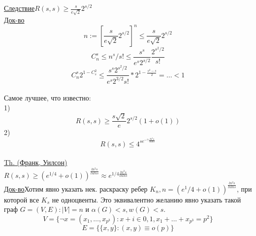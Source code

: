 \documentclass{article}
\begin{document}
\underline{Следствие}$R(s,s) \ge \frac{s}{e\sqrt{2}}2^{s/2}$\\
\underline{Док-во}\\
$$n:=[\frac{s}{e\sqrt{2}}2^{s/2}]^n \le \frac{s}{e\sqrt{2}}2^{s/2}$$
$$C_n^s \le n^s/s! \le \frac{s^s}{e^s2^{s/2}}\frac{2^{s^2/2}}{s!}$$
$$C_n^s2^{1-C_s^2} \le \frac{s^s2^{s^2/2}}{e^s2^{3/2}s!}*2^{1-\frac{s^2-s}{2}}=\ldots <1$$
\\

Самое лучшее, что известно:\\
1)$$ R(s,s) \ge \frac{s\sqrt 2}{e}2^{s/2}(1 + o(1))$$
2)$$ R(s,s) \le 4^{se}^{-\gamma\frac{ln^2s}{ln ln s}}$$\\

\underline{Th. (Франк, Уилсон)}\\$R(s,s) \ge(e^{1/4} + o(1))^{\frac{ln^2s}{ln ln s}} \approx e^{1/4\frac{ln^2 s}{ln ln s}}$\\
\underline{Док-во}Хотим явно указать нек. раскраску ребер $K_n, n=(e^1/4 + o(1))^\frac{ln^2 s}{ln ln s}$, при которой
все $K_s$ не одноцвенты. Это эквивалентно желанию явно указать такой граф $G=(V,E):|V|=n$ и $\alpha(G) < s, w(G) < s$.
$$V=\{\neg x = (x_1,\ldots,x_{p^3}): x+i \in {0,1}, x_1 + \ldots + x_{p^3} = p^2\}$$
$$E = \{ \{x,y\}: (x,y) \equiv o(p)\}$$
\end{document}
